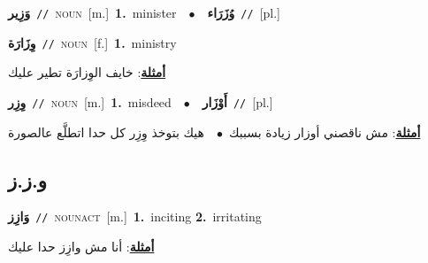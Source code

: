 \documentclass[10pt,a4paper,twoside]{article} %
\begin{document}
\begin{multicols}{2}
{\setlength\topsep{0pt}\textbf{\foreignlanguage{arabic}{وَزِير}}\ {\color{gray}\texttt{//}\color{black}}\ \textsc{noun}\ [m.]\ \textbf{1.}~minister\ \ $\bullet$\ \ \setlength\topsep{0pt}\textbf{\foreignlanguage{arabic}{وُزَرَاء}}\ {\color{gray}\texttt{//}\color{black}}\ [pl.]\ } \vspace{2mm}

{\setlength\topsep{0pt}\textbf{\foreignlanguage{arabic}{وِزَارَة}}\ {\color{gray}\texttt{//}\color{black}}\ \textsc{noun}\ [f.]\ \textbf{1.}~ministry\  \begin{flushright}\color{gray}\foreignlanguage{arabic}{\textbf{\underline{\foreignlanguage{arabic}{أمثلة}}}: خايف الوِزارَة تطير عليك}\end{flushright}\color{black}} \vspace{2mm}

{\setlength\topsep{0pt}\textbf{\foreignlanguage{arabic}{وِزِر}}\ {\color{gray}\texttt{//}\color{black}}\ \textsc{noun}\ [m.]\ \textbf{1.}~misdeed\ \ $\bullet$\ \ \setlength\topsep{0pt}\textbf{\foreignlanguage{arabic}{أَوْزَار}}\ {\color{gray}\texttt{//}\color{black}}\ [pl.]\  \begin{flushright}\color{gray}\foreignlanguage{arabic}{\textbf{\underline{\foreignlanguage{arabic}{أمثلة}}}: مش ناقصني أوزار زيادة بسببك\ $\bullet$\ \  هيك بتوخذ وِزِر كل حدا اتطلَّع عالصورة}\end{flushright}\color{black}} \vspace{2mm}

\vspace{-3mm}
\subsection*{\color{blue}\foreignlanguage{arabic}{و.ز.ز}\color{blue}{}} 

{\setlength\topsep{0pt}\textbf{\foreignlanguage{arabic}{وَازِز}}\ {\color{gray}\texttt{//}\color{black}}\ \textsc{noun\textunderscore act}\ [m.]\ \textbf{1.}~inciting  \textbf{2.}~irritating\  \begin{flushright}\color{gray}\foreignlanguage{arabic}{\textbf{\underline{\foreignlanguage{arabic}{أمثلة}}}: أنا مش وازِز حدا عليك}\end{flushright}\color{black}} \vspace{2mm}


\end{multicols}
\end{document}
